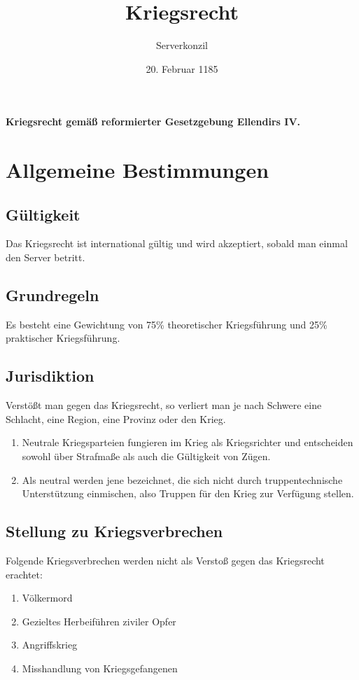 \documentclass{article}
\title{Kriegsrecht}
\author{Serverkonzil}
\date{20. Februar 1185}
\begin{document}
\maketitle
\vspace*{\fill}
\paragraph{Kriegsrecht gemäß reformierter Gesetzgebung Ellendirs IV.}

\newpage
\section{Allgemeine Bestimmungen}
\subsection{Gültigkeit}
Das Kriegsrecht ist international gültig und wird akzeptiert, sobald man einmal den Server betritt.

\subsection{Grundregeln}
Es besteht eine Gewichtung von 75\% theoretischer Kriegsführung und 25\% praktischer Kriegsführung.

\subsection{Jurisdiktion}
Verstößt man gegen das Kriegsrecht, so verliert man je nach Schwere eine Schlacht, eine Region, eine Provinz oder den Krieg.
\begin{enumerate}[(1)]
	\item Neutrale Kriegsparteien fungieren im Krieg als Kriegsrichter und entscheiden sowohl über Strafmaße als auch die Gültigkeit von Zügen.
	\item Als neutral werden jene bezeichnet, die sich nicht durch truppentechnische Unterstützung einmischen, also Truppen für den Krieg zur Verfügung stellen.
\end{enumerate}

\subsection{Stellung zu Kriegsverbrechen}
Folgende Kriegsverbrechen werden nicht als Verstoß gegen das Kriegsrecht erachtet:
\begin{enumerate}
	\item Völkermord
	\item Gezieltes Herbeiführen ziviler Opfer
	\item Angriffskrieg
	\item Misshandlung von Kriegsgefangenen
\end{enumerate}
\end{document}
